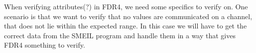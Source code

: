 When verifying attributes(?) in FDR4, we need some specifics to verify on. One scenario is that we want to verify that no values are communicated on a channel, that does not lie within the expected range. In this case we will have to get the correct data from the SMEIL program and handle them in a way that gives FDR4 something to verify.
